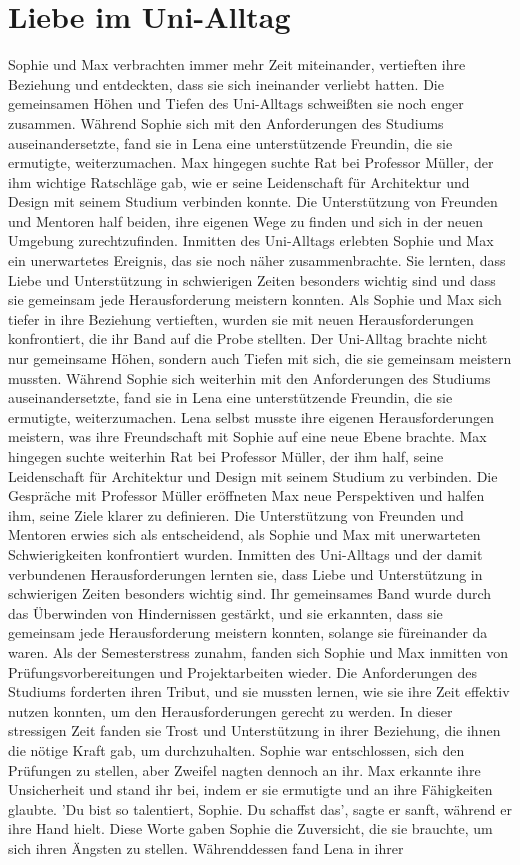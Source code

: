 \documentclass[12pt]{article} %
\begin{document}
\section{ Liebe im Uni-Alltag }
 Sophie und Max verbrachten immer mehr Zeit miteinander, vertieften ihre Beziehung und entdeckten, dass sie sich ineinander verliebt hatten. Die gemeinsamen Höhen und Tiefen des Uni-Alltags schweißten sie noch enger zusammen. Während Sophie sich mit den Anforderungen des Studiums auseinandersetzte, fand sie in Lena eine unterstützende Freundin, die sie ermutigte, weiterzumachen. Max hingegen suchte Rat bei Professor Müller, der ihm wichtige Ratschläge gab, wie er seine Leidenschaft für Architektur und Design mit seinem Studium verbinden konnte. Die Unterstützung von Freunden und Mentoren half beiden, ihre eigenen Wege zu finden und sich in der neuen Umgebung zurechtzufinden. Inmitten des Uni-Alltags erlebten Sophie und Max ein unerwartetes Ereignis, das sie noch näher zusammenbrachte. Sie lernten, dass Liebe und Unterstützung in schwierigen Zeiten besonders wichtig sind und dass sie gemeinsam jede Herausforderung meistern konnten. Als Sophie und Max sich tiefer in ihre Beziehung vertieften, wurden sie mit neuen Herausforderungen konfrontiert, die ihr Band auf die Probe stellten. Der Uni-Alltag brachte nicht nur gemeinsame Höhen, sondern auch Tiefen mit sich, die sie gemeinsam meistern mussten. Während Sophie sich weiterhin mit den Anforderungen des Studiums auseinandersetzte, fand sie in Lena eine unterstützende Freundin, die sie ermutigte, weiterzumachen. Lena selbst musste ihre eigenen Herausforderungen meistern, was ihre Freundschaft mit Sophie auf eine neue Ebene brachte. Max hingegen suchte weiterhin Rat bei Professor Müller, der ihm half, seine Leidenschaft für Architektur und Design mit seinem Studium zu verbinden. Die Gespräche mit Professor Müller eröffneten Max neue Perspektiven und halfen ihm, seine Ziele klarer zu definieren. Die Unterstützung von Freunden und Mentoren erwies sich als entscheidend, als Sophie und Max mit unerwarteten Schwierigkeiten konfrontiert wurden. Inmitten des Uni-Alltags und der damit verbundenen Herausforderungen lernten sie, dass Liebe und Unterstützung in schwierigen Zeiten besonders wichtig sind. Ihr gemeinsames Band wurde durch das Überwinden von Hindernissen gestärkt, und sie erkannten, dass sie gemeinsam jede Herausforderung meistern konnten, solange sie füreinander da waren. Als der Semesterstress zunahm, fanden sich Sophie und Max inmitten von Prüfungsvorbereitungen und Projektarbeiten wieder. Die Anforderungen des Studiums forderten ihren Tribut, und sie mussten lernen, wie sie ihre Zeit effektiv nutzen konnten, um den Herausforderungen gerecht zu werden. In dieser stressigen Zeit fanden sie Trost und Unterstützung in ihrer Beziehung, die ihnen die nötige Kraft gab, um durchzuhalten. Sophie war entschlossen, sich den Prüfungen zu stellen, aber Zweifel nagten dennoch an ihr. Max erkannte ihre Unsicherheit und stand ihr bei, indem er sie ermutigte und an ihre Fähigkeiten glaubte. 'Du bist so talentiert, Sophie. Du schaffst das', sagte er sanft, während er ihre Hand hielt. Diese Worte gaben Sophie die Zuversicht, die sie brauchte, um sich ihren Ängsten zu stellen. Währenddessen fand Lena in ihrer 
\end{document}
